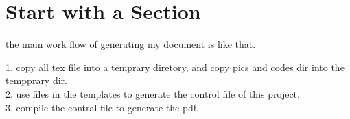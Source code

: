 
\section{Start with a Section}

the main work flow of generating my document is like that.

1. copy all tex file into a temprary diretory, and copy pics and codes dir into the tempprary dir.\\
2. use files in the templates to generate the control file of this project. \\
3. compile the contral file to generate the pdf. \\



\newpage
